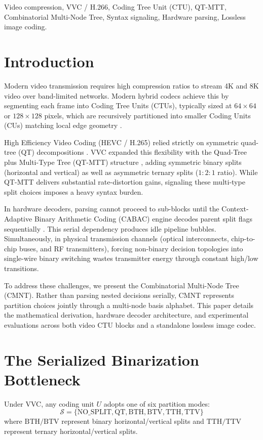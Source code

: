 \documentclass[conference]{IEEEtran}
\begin{document}
\begin{IEEEkeywords}
Video compression, VVC / H.266, Coding Tree Unit (CTU), QT-MTT, Combinatorial Multi-Node Tree, Syntax signaling, Hardware parsing, Lossless image coding.
\end{IEEEkeywords}

\section{Introduction}
Modern video transmission requires high compression ratios to stream 4K and 8K video over band-limited networks. Modern hybrid codecs achieve this by segmenting each frame into Coding Tree Units (CTUs), typically sized at $64\times64$ or $128\times128$ pixels, which are recursively partitioned into smaller Coding Units (CUs) matching local edge geometry \cite{bross2021overview}.

High Efficiency Video Coding (HEVC / H.265) relied strictly on symmetric quad-tree (QT) decompositions \cite{sullivan2012overview}. VVC expanded this flexibility with the Quad-Tree plus Multi-Type Tree (QT-MTT) structure \cite{chen2019algorithm}, adding symmetric binary splits (horizontal and vertical) as well as asymmetric ternary splits ($1:2:1$ ratio). While QT-MTT delivers substantial rate-distortion gains, signaling these multi-type split choices imposes a heavy syntax burden. 

In hardware decoders, parsing cannot proceed to sub-blocks until the Context-Adaptive Binary Arithmetic Coding (CABAC) engine decodes parent split flags sequentially \cite{marpe2003context}. This serial dependency produces idle pipeline bubbles. Simultaneously, in physical transmission channels (optical interconnects, chip-to-chip buses, and RF transmitters), forcing non-binary decision topologies into single-wire binary switching wastes transmitter energy through constant high/low transitions.

To address these challenges, we present the Combinatorial Multi-Node Tree (CMNT). Rather than parsing nested decisions serially, CMNT represents partition choices jointly through a multi-node basis alphabet. This paper details the mathematical derivation, hardware decoder architecture, and experimental evaluations across both video CTU blocks and a standalone lossless image codec.

\section{The Serialized Binarization Bottleneck}
Under VVC, any coding unit $U$ adopts one of six partition modes:
\begin{equation}
\mathcal{S} = \{ \text{NO\_SPLIT}, \text{QT}, \text{BTH}, \text{BTV}, \text{TTH}, \text{TTV} \}
\end{equation}
where $\text{BTH}/\text{BTV}$ represent binary horizontal/vertical splits and $\text{TTH}/\text{TTV}$ represent ternary horizontal/vertical splits.
\end{document}
